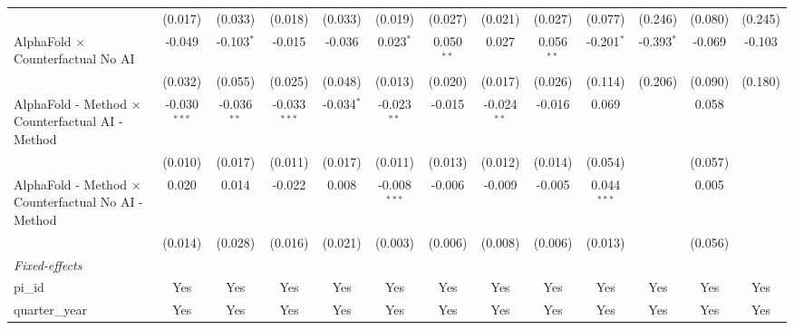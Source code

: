 \begin{tabular}{lcccccccccccc}
                                                              & (0.017)        & (0.033)       & (0.018)        & (0.033)      & (0.019)        & (0.027)      & (0.021)       & (0.027)      & (0.077)       & (0.246)       & (0.080)       & (0.245)\\   
   AlphaFold $\times$ Counterfactual No AI                    & -0.049         & -0.103$^{*}$  & -0.015         & -0.036       & 0.023$^{*}$    & 0.050$^{**}$ & 0.027         & 0.056$^{**}$ & -0.201$^{*}$  & -0.393$^{*}$  & -0.069        & -0.103\\   
                                                              & (0.032)        & (0.055)       & (0.025)        & (0.048)      & (0.013)        & (0.020)      & (0.017)       & (0.026)      & (0.114)       & (0.206)       & (0.090)       & (0.180)\\   
   AlphaFold - Method $\times$ Counterfactual AI - Method     & -0.030$^{***}$ & -0.036$^{**}$ & -0.033$^{***}$ & -0.034$^{*}$ & -0.023$^{**}$  & -0.015       & -0.024$^{**}$ & -0.016       & 0.069         &               & 0.058         &   \\   
                                                              & (0.010)        & (0.017)       & (0.011)        & (0.017)      & (0.011)        & (0.013)      & (0.012)       & (0.014)      & (0.054)       &               & (0.057)       &   \\   
   AlphaFold - Method $\times$ Counterfactual No AI - Method  & 0.020          & 0.014         & -0.022         & 0.008        & -0.008$^{***}$ & -0.006       & -0.009        & -0.005       & 0.044$^{***}$ &               & 0.005         &   \\   
                                                              & (0.014)        & (0.028)       & (0.016)        & (0.021)      & (0.003)        & (0.006)      & (0.008)       & (0.006)      & (0.013)       &               & (0.056)       &   \\   
   \midrule
   \emph{Fixed-effects}\\
   pi\_id                                                     & Yes            & Yes           & Yes            & Yes          & Yes            & Yes          & Yes           & Yes          & Yes           & Yes           & Yes           & Yes\\  
   quarter\_year                                              & Yes            & Yes           & Yes            & Yes          & Yes            & Yes          & Yes           & Yes          & Yes           & Yes           & Yes           & Yes\\  

\end{tabular}
